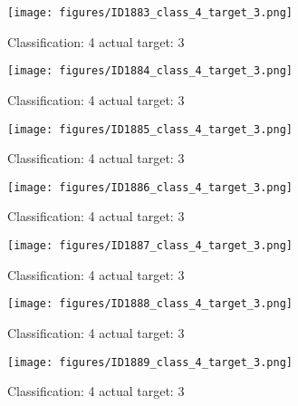 \begin{figure}[h!]
\begin{center}
\texttt{[image: figures/ID1883\_class\_4\_target\_3.png]}
\end{center}
\caption{ Classification: 4 actual target: 3}
\label{fig:ID1883_class_4_target_3}
\end{figure}
\begin{figure}[h!]
\begin{center}
\texttt{[image: figures/ID1884\_class\_4\_target\_3.png]}
\end{center}
\caption{ Classification: 4 actual target: 3}
\label{fig:ID1884_class_4_target_3}
\end{figure}
\begin{figure}[h!]
\begin{center}
\texttt{[image: figures/ID1885\_class\_4\_target\_3.png]}
\end{center}
\caption{ Classification: 4 actual target: 3}
\label{fig:ID1885_class_4_target_3}
\end{figure}
\begin{figure}[h!]
\begin{center}
\texttt{[image: figures/ID1886\_class\_4\_target\_3.png]}
\end{center}
\caption{ Classification: 4 actual target: 3}
\label{fig:ID1886_class_4_target_3}
\end{figure}
\begin{figure}[h!]
\begin{center}
\texttt{[image: figures/ID1887\_class\_4\_target\_3.png]}
\end{center}
\caption{ Classification: 4 actual target: 3}
\label{fig:ID1887_class_4_target_3}
\end{figure}
\begin{figure}[h!]
\begin{center}
\texttt{[image: figures/ID1888\_class\_4\_target\_3.png]}
\end{center}
\caption{ Classification: 4 actual target: 3}
\label{fig:ID1888_class_4_target_3}
\end{figure}
\begin{figure}[h!]
\begin{center}
\texttt{[image: figures/ID1889\_class\_4\_target\_3.png]}
\end{center}
\caption{ Classification: 4 actual target: 3}
\label{fig:ID1889_class_4_target_3}
\end{figure}
